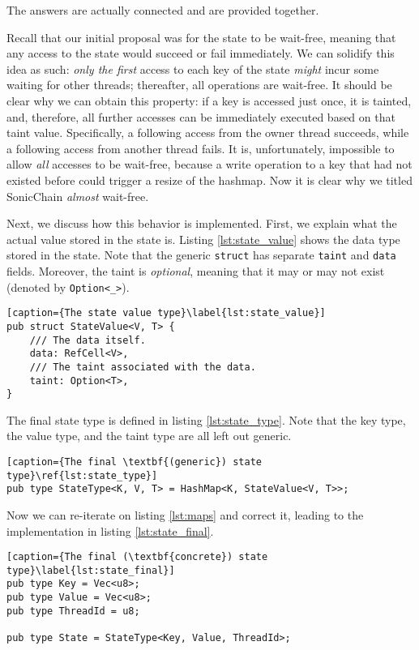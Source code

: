The answers are actually connected and are provided together.

Recall that our initial proposal was for the state to be wait-free, meaning that any access to the
state would succeed or fail immediately. We can solidify this idea as such: \textit{only the first}
access to each key of the state \textit{might} incur some waiting for other threads; thereafter, all
operations are wait-free. It should be clear why we can obtain this property: if a key is accessed
just once, it is tainted, and, therefore, all further accesses can be immediately executed based on
that taint value. Specifically, a following access from the owner thread succeeds, while a following
access from another thread fails. It is, unfortunately, impossible to allow \textit{all} accesses to
be wait-free, because a write operation to a key that had not existed before could trigger a resize
of the hashmap. Now it is clear why we titled SonicChain \textit{almost} wait-free.

Next, we discuss how this behavior is implemented. First, we explain what the actual value stored in
the state is. Listing \ref{lst:state_value} shows the data type stored in the state. Note that the
generic \texttt{struct} has separate \texttt{taint} and \texttt{data} fields. Moreover, the taint is
\textit{optional}, meaning that it may or may not exist (denoted by \texttt{Option<\_>}).

\begin{lstlisting}[caption={The state value type}\label{lst:state_value}]
pub struct StateValue<V, T> {
	/// The data itself.
	data: RefCell<V>,
	/// The taint associated with the data.
	taint: Option<T>,
}
\end{lstlisting}

The final state type is defined in listing \ref{lst:state_type}. Note that the key type, the value
type, and the taint type are all left out generic.

\begin{lstlisting}[caption={The final \textbf{(generic}) state type}\ref{lst:state_type}]
pub type StateType<K, V, T> = HashMap<K, StateValue<V, T>>;
\end{lstlisting}

Now we can re-iterate on listing \ref{lst:maps} and correct it, leading to the implementation in
listing \ref{lst:state_final}.

\begin{lstlisting}[caption={The final (\textbf{concrete}) state type}\label{lst:state_final}]
pub type Key = Vec<u8>;
pub type Value = Vec<u8>;
pub type ThreadId = u8;

pub type State = StateType<Key, Value, ThreadId>;
\end{lstlisting}


